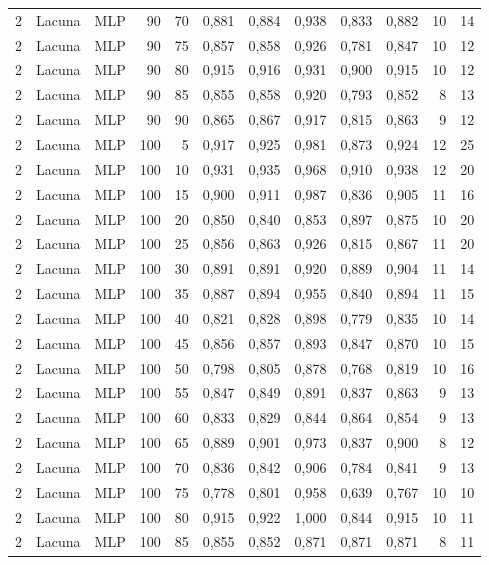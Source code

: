 \begin{longtable}{@{}rllrrrrrrrrr@{}}
2 & Lacuna & MLP & 90 & 70 & 0,881 & 0,884 & 0,938 & 0,833 & 0,882 & 10 & 14 \\
2 & Lacuna & MLP & 90 & 75 & 0,857 & 0,858 & 0,926 & 0,781 & 0,847 & 10 & 12 \\
2 & Lacuna & MLP & 90 & 80 & 0,915 & 0,916 & 0,931 & 0,900 & 0,915 & 10 & 12 \\
2 & Lacuna & MLP & 90 & 85 & 0,855 & 0,858 & 0,920 & 0,793 & 0,852 & 8 & 13 \\
2 & Lacuna & MLP & 90 & 90 & 0,865 & 0,867 & 0,917 & 0,815 & 0,863 & 9 & 12 \\
2 & Lacuna & MLP & 100 & 5 & 0,917 & 0,925 & 0,981 & 0,873 & 0,924 & 12 & 25 \\
2 & Lacuna & MLP & 100 & 10 & 0,931 & 0,935 & 0,968 & 0,910 & 0,938 & 12 & 20 \\
2 & Lacuna & MLP & 100 & 15 & 0,900 & 0,911 & 0,987 & 0,836 & 0,905 & 11 & 16 \\
2 & Lacuna & MLP & 100 & 20 & 0,850 & 0,840 & 0,853 & 0,897 & 0,875 & 10 & 20 \\
2 & Lacuna & MLP & 100 & 25 & 0,856 & 0,863 & 0,926 & 0,815 & 0,867 & 11 & 20 \\
2 & Lacuna & MLP & 100 & 30 & 0,891 & 0,891 & 0,920 & 0,889 & 0,904 & 11 & 14 \\
2 & Lacuna & MLP & 100 & 35 & 0,887 & 0,894 & 0,955 & 0,840 & 0,894 & 11 & 15 \\
2 & Lacuna & MLP & 100 & 40 & 0,821 & 0,828 & 0,898 & 0,779 & 0,835 & 10 & 14 \\
2 & Lacuna & MLP & 100 & 45 & 0,856 & 0,857 & 0,893 & 0,847 & 0,870 & 10 & 15 \\
2 & Lacuna & MLP & 100 & 50 & 0,798 & 0,805 & 0,878 & 0,768 & 0,819 & 10 & 16 \\
2 & Lacuna & MLP & 100 & 55 & 0,847 & 0,849 & 0,891 & 0,837 & 0,863 & 9 & 13 \\
2 & Lacuna & MLP & 100 & 60 & 0,833 & 0,829 & 0,844 & 0,864 & 0,854 & 9 & 13 \\
2 & Lacuna & MLP & 100 & 65 & 0,889 & 0,901 & 0,973 & 0,837 & 0,900 & 8 & 12 \\
2 & Lacuna & MLP & 100 & 70 & 0,836 & 0,842 & 0,906 & 0,784 & 0,841 & 9 & 13 \\
2 & Lacuna & MLP & 100 & 75 & 0,778 & 0,801 & 0,958 & 0,639 & 0,767 & 10 & 10 \\
2 & Lacuna & MLP & 100 & 80 & 0,915 & 0,922 & 1,000 & 0,844 & 0,915 & 10 & 11 \\
2 & Lacuna & MLP & 100 & 85 & 0,855 & 0,852 & 0,871 & 0,871 & 0,871 & 8 & 11 \\

\end{longtable}
